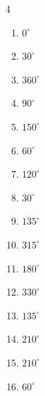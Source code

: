 \begin{multicols}{4}
\begin{enumerate}
  \item $\displaystyle 0^{\circ}$
        \phantom{$\displaystyle =0$}

  \item $\displaystyle 30^{\circ}$

  \item $\displaystyle 360^{\circ}$
        \phantom{$\displaystyle =2\pi$}

  \item $\displaystyle 90^{\circ}$

  \item $\displaystyle 150^{\circ}$

  \item $\displaystyle 60^{\circ}$

  \item $\displaystyle 120^{\circ}$

  \item $\displaystyle 30^{\circ}$

  \item $\displaystyle 135^{\circ}$

  \item $\displaystyle 315^{\circ}$

  \item $\displaystyle 180^{\circ}$
        \phantom{$\displaystyle =\pi$}

\columnbreak %

  \item $\displaystyle 330^{\circ}$

  \item $\displaystyle 135^{\circ}$

  \item $\displaystyle 210^{\circ}$

  \item $\displaystyle 210^{\circ}$

  \item $\displaystyle 60^{\circ}$


\end{enumerate}
\end{multicols}
